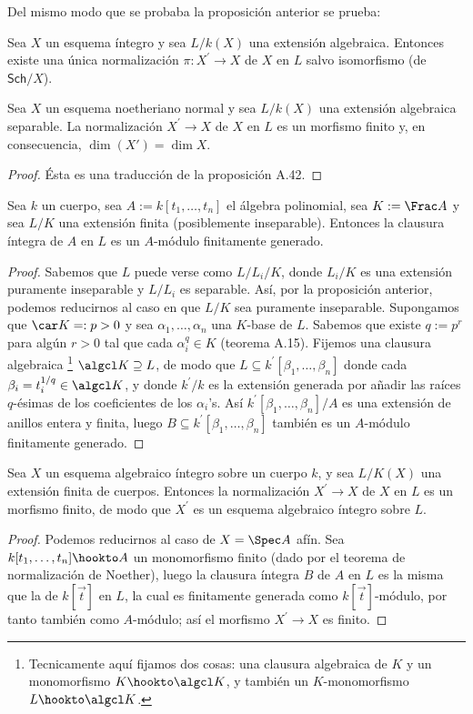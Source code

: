 Del mismo modo que se probaba la proposición anterior se prueba:
\begin{prop}
	Sea $X$ un esquema íntegro y sea $L/k(X)$ una extensión algebraica.
	Entonces existe una única normalización $\pi \colon X^\prime \to X$ de $X$
	en $L$ salvo isomorfismo (de $\mathsf{Sch}/X$).
\end{prop}

\begin{prop}
	Sea $X$ un esquema noetheriano normal y sea $L/k(X)$ una extensión algebraica separable.
	La normalización $X^\prime \to X$ de $X$ en $L$ es un morfismo finito y, en consecuencia, $\dim(X') = \dim X$.
\end{prop}
\begin{proof}
	Ésta es una traducción de la proposición A.42.
\end{proof}

\begin{prop}
	Sea $k$ un cuerpo, sea $A := k[t_1, \dots, t_n]$ el álgebra
	polinomial, sea $K := \Frac A$ y sea $L/K$ una extensión finita (posiblemente inseparable).
	Entonces la clausura íntegra de $A$ en $L$ es un $A$-módulo finitamente generado.
\end{prop}
\begin{proof}
	Sabemos que $L$ puede verse como $L/L_i/K$, donde $L_i/K$
	es una extensión puramente inseparable y $L/L_i$ es separable. Así, por la
	proposición anterior, podemos reducirnos al caso en que $L/K$ sea puramente
	inseparable. Supongamos que $\car K =: p > 0$ y sea $\alpha_1, \dots, \alpha_n$ una $K$-base
	de $L$. Sabemos que existe $q := p^r$ para algún $r > 0$ tal que cada $\alpha_i^q \in
	K$ (teorema A.15). Fijemos una clausura algebraica%
	\footnote{Tecnicamente aquí fijamos dos cosas: una clausura algebraica de $K$ y un monomorfismo $K \hookto \algcl K$,
		y también un $K$-monomorfismo $L \hookto \algcl K$.}
	$\algcl K \supseteq L$, de modo que $L \subseteq k^\prime[\beta_1, \dots, \beta_n]$ donde cada $\beta_i = t_i^{1/q} \in \algcl K$,
	y donde $k^\prime/k$ es la extensión generada por añadir las raíces $q$-ésimas de los coeficientes de los
	$\alpha_i$'s. Así $k^\prime[\beta_1, \dots, \beta_n]/A$ es una extensión de anillos entera y finita, luego
	$B \subseteq k^\prime[\beta_1, \dots, \beta_n]$ también es un $A$-módulo finitamente generado.
\end{proof}

\begin{prop}
	Sea $X$ un esquema algebraico íntegro sobre un cuerpo $k$, y sea $L/K(X)$ una extensión finita de cuerpos.
	Entonces la normalización $X^\prime \to X$ de $X$ en $L$ es un morfismo finito, de modo que $X^\prime$ es un esquema algebraico íntegro sobre $L$.
\end{prop}
\begin{proof}
	Podemos reducirnos al caso de $X = \Spec A$ afín. Sea
	$k[t_1, \dots, t_n] \hookto A$ un monomorfismo finito (dado por el teorema de normalización de Noether),
	luego la clausura íntegra $B$ de $A$ en $L$ es la misma que la de $k[\vec t]$ en $L$, la cual es finitamente generada como $k[\vec t]$-módulo, por tanto
	también como $A$-módulo; así el morfismo $X^\prime \to X$ es finito.
\end{proof}


